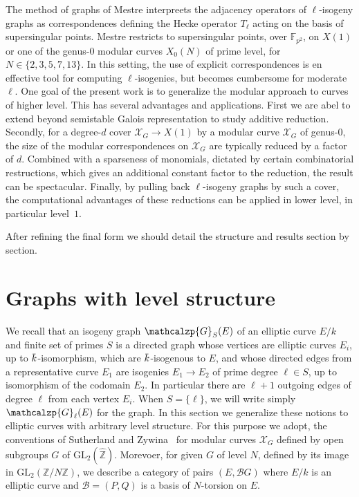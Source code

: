 \documentclass{amsart}
\newcommand{\cB}{\mathcal{B}}
\newcommand{\FF}{\mathbb{F}}
\newcommand{\ZZ}{\mathbb{Z}}
\newcommand{\ZZhat}{\widehat{\ZZ}}
\newcommand{\XC}{\mathcal{X}}
\newcommand{\GL}{\mathrm{GL}}
\newcommand{\SL}{\mathrm{SL}}
\newcommand{\overbar}[1]{\mkern 2.0mu\overline{\mkern-2.0mu#1\mkern-2.0mu}\mkern 2.0mu}
\newcommand{\kbar}{\overbar{\smash{k}\vphantom{t}}}
\newcommand{\Graph}{\mathcalzp{G}}
\newcommand{\Group}{G}
\begin{document}
The method of graphs of Mestre interpreets the adjacency operators of
$\ell$-isogeny graphs as correspondences defining the Hecke operator
$T_\ell$ acting on the basis of supersingular points.
Mestre restricts to supersingular points, over $\FF_{p^2}$, on $X(1)$
or one of the genus-$0$ modular curves $X_0(N)$ of prime level, for
$N \in \{2,3,5,7,13\}$.  In this setting, the use of explicit correspondences
is en effective tool for computing $\ell$-isogenies, but becomes cumbersome
for moderate $\ell$.  One goal of the present work is to generalize the
modular approach to curves of higher level.  This has several advantages
and applications.  First we are abel to extend beyond semistable Galois
representation to study additive reduction.  Secondly, for a degree-$d$
cover $\XC_G \to X(1)$ by a modular curve $\XC_G$ of genus-$0$, the
size of the modular correspondences on $\XC_G$ are typically reduced by
a factor of $d$.  Combined with a sparseness of monomials, dictated by
certain combinatorial restructions, which gives an additional constant
factor to the reduction, the result can be spectacular.  Finally, by
pulling back $\ell$-isogeny graphs by such a cover, the computational
advantages of these reductions can be applied in lower level, in
particular level~$1$.

\medskip
\begin{commentDRK}
  After refining the final form we should detail the structure and results
  section by section.
\end{commentDRK}


\section{Graphs with level structure}
\label{Section:ModularGraphs}

We recall that an isogeny graph $\Graph_S(E)$ of an elliptic curve
$E/k$ and finite set of primes $S$ is a directed graph whose vertices
are elliptic curves $E_i$, up to $\kbar$-isomorphism, which are
$\kbar$-isogenous to $E$, and whose directed edges from a representative
curve $E_1$ are isogenies $E_1 \to E_2$ of prime degree $\ell \in S$, up
to isomorphism of the codomain $E_2$.  In particular there
are $\ell+1$ outgoing edges of degree $\ell$ from each vertex $E_i$.
When $S = \{\ell\}$, we will write simply $\Graph_\ell(E)$ for the graph.
In this section we generalize these notions to elliptic curves with
arbitrary level structure. For this purpose we adopt, the conventions
of Sutherland and Zywina~\cite{SutherlandZywina} for modular curves $\XC_G$
defined by open subgroups $\Group$ of $\GL_2(\ZZhat)$.
Morevoer, for given $G$ of level $N$, defined by its image in $\GL_2(\ZZ/N\ZZ)$,
we describe a category of pairs $(E,\cB\Group)$ where $E/k$ is an elliptic
curve and $\cB = (P,Q)$ is a basis of $N$-torsion on $E$.
\end{document}
